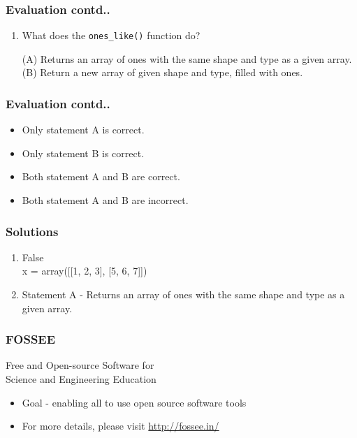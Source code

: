 \documentclass[17pt,compress]{beamer}
\newcounter{saveenumi}
\newcommand{\conti}{\setcounter{enumi}{\value{saveenumi}}}
\begin{document}
\begin{frame}
\frametitle{Evaluation contd..}
\label{sec-10.2}


\begin{enumerate}
\conti
\item What does the \texttt{ones\_like()} function do?
   
     (A) Returns an array of ones with the same shape and type as a
         given array.\\
     (B) Return a new array of given shape and type, filled with ones.
\vspace{6pt}     

\end{enumerate}
\end{frame}
\begin{frame}
\frametitle{Evaluation contd..}
\label{sec-10.3}

\begin{itemize}
\item Only statement A is correct.
\item Only statement B is correct.
\item Both statement A and B are correct.
\item Both statement A and B are incorrect.
\end{itemize}
\end{frame}
\begin{frame}
\frametitle{Solutions}
\label{sec-11}


\begin{enumerate}
\item False\\
     x = array([[1, 2, 3], [5, 6, 7]])
\vspace{12pt}
\item Statement A - Returns an array of ones with the same shape and type as a
                  given array.
\end{enumerate}
\end{frame}
\begin{frame}
\frametitle{FOSSEE}
{\color{blue}Free and Open-source Software for \\Science and Engineering Education} \\
\begin{itemize}
\item Goal - enabling all to use open source software tools
\item For more details, please visit {\color{blue}\url{http://fossee.in/}}
\end{itemize}
\end{frame}
\end{document}
